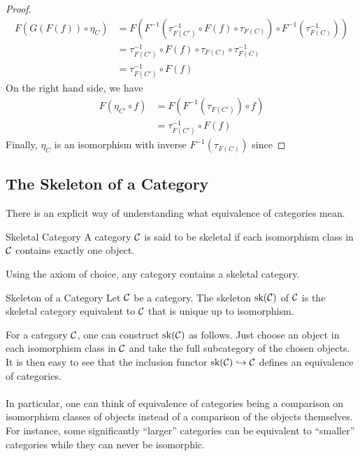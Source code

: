 \documentclass[a4paper]{article}
\begin{document}
\begin{prp}{}{}
\begin{proof}
\begin{align*}
F(G(F(f))\circ\eta_C)&=F\left(F^{-1}\left(\tau_{F(C')}^{-1}\circ F(f)\circ\tau_{F(C)}\right)\circ F^{-1}\left(\tau_{F(C)}^{-1}\right)\right)\\
&=\tau_{F(C')}^{-1}\circ F(f)\circ\tau_{F(C)}\circ\tau_{F(C)}^{-1}\\
&=\tau_{F(C')}^{-1}\circ F(f)
\end{align*}
On the right hand side, we have
\begin{align*}
F(\eta_{C'}\circ f)&=F(F^{-1}(\tau_{F(C')})\circ f)\\
&=\tau_{F(C')}^{-1}\circ F(f)
\end{align*}
Finally, $\eta_C$ is an isomorphism with inverse $F^{-1}(\tau_{F(C)})$ since 
\end{proof}
\end{prp}

\subsection{The Skeleton of a Category}
There is an explicit way of understanding what equivalence of categories mean. 

\begin{defn}{Skeletal Category}{} A category $\mathcal{C}$ is said to be skeletal if each isomorphism class in $\mathcal{C}$ contains exactly one object. 
\end{defn}

Using the axiom of choice, any category contains a skeletal category. 

\begin{defn}{Skeleton of a Category}{} Let $\mathcal{C}$ be a category. The skeleton $\text{sk}(\mathcal{C})$ of $\mathcal{C}$ is the skeletal category equivalent to $\mathcal{C}$ that is unique up to isomorphism. 
\end{defn}

For a category $\mathcal{C}$, one can construct $\text{sk}(\mathcal{C})$ as follows. Just choose an object in each isomorphism class in $\mathcal{C}$ and take the full subcategory of the chosen objects. It is then easy to see that the inclusion functor $\text{sk}(\mathcal{C})\hookrightarrow\mathcal{C}$ defines an equivalence of categories. \\~\\

In particular, one can think of equivalence of categories being a comparison on isomorphism classes of objects instead of a comparison of the objects themselves. For instance, some significantly ``larger'' categories can be equivalent to ``smaller'' categories while they can never be isomorphic. 
\end{document}
